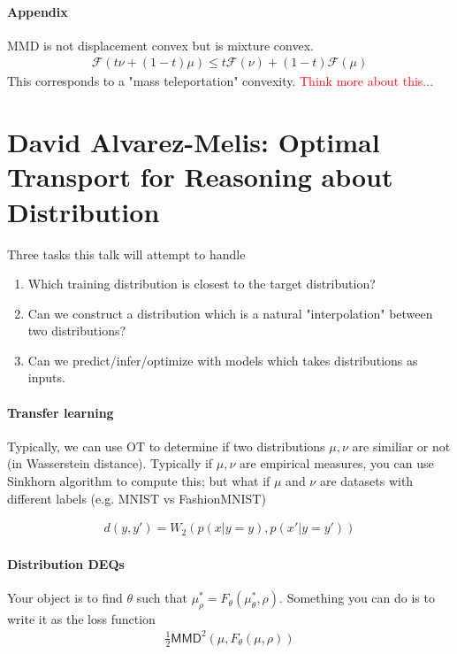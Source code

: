 \documentclass[11pt,fleqn]{article}
\numberwithin{equation}{section}
\theoremstyle{definition}
\theoremstyle{definition}
\begin{document}
\paragraph{Appendix} MMD is not displacement convex but is mixture convex.
\begin{align}
	\mathcal F(t \nu + (1-t) \mu) \leq t \mathcal F(\nu) + (1-t) \mathcal F(\mu)
\end{align} 
This corresponds to a "mass teleportation" convexity. \textcolor{red}{Think more about this...}



\newpage
\section{David Alvarez-Melis: Optimal Transport for Reasoning about Distribution}
Three tasks this talk will attempt to handle
\begin{enumerate}
	\item Which training distribution is closest to the target distribution?
	\item Can we construct a distribution which is a natural "interpolation" between two distributions?
	\item Can we predict/infer/optimize with models which takes distributions as inputs.
\end{enumerate}

\paragraph{Transfer learning} Typically, we can use OT to determine if two distributions $\mu, \nu$ are similiar or not (in Wasserstein distance). Typically if $\mu,\nu$ are empirical measures, you can use Sinkhorn algorithm to compute this; but what if $\mu$ and $\nu$ are datasets with different labels (e.g. MNIST vs FashionMNIST) 
\begin{definition}
	\begin{align}
		d(y, y') = W_2(p(x|y = y) , p(x'|y=y'))
	\end{align}
	
\end{definition}

\paragraph{Distribution DEQs}
Your object is to find $\theta$ such that $\mu^*_\rho = F_\theta(\mu^*_\theta, \rho)$. Something you can do is to write it as the loss function
\begin{align}
	\frac{1}{2}\textsf{MMD}^2(\mu, F_\theta(\mu, \rho))
\end{align}
\end{document}
